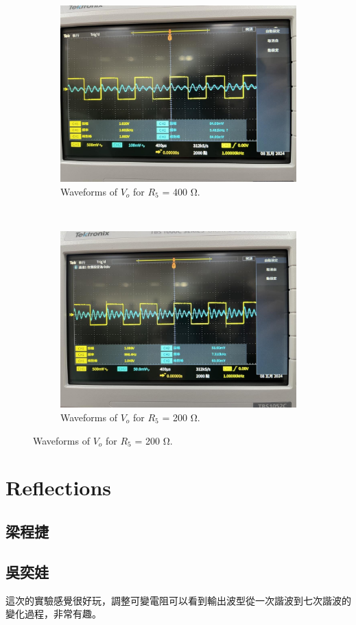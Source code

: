\documentclass{article}
\begin{document}
\begin{CJK*}{UTF8}{bkai}
\begin{figure}[h]
    \begin{center}
        \begin{subfigure}[b]{0.45\textwidth}
            \includegraphics[width=\textwidth]{5th_harmonic.jpg}
            \caption*{Waveforms of $V_o$ for $R_5$ = 400 \unit{\ohm}.}
        \end{subfigure}
        ~
        \begin{subfigure}[b]{0.45\textwidth}
            \includegraphics[width=\textwidth]{7th_harmonic.jpg}
            \caption*{Waveforms of $V_o$ for $R_5$ = 200 \unit{\ohm}.}
        \end{subfigure}
    \end{center}
\end{figure}

\section*{Reflections}
\subsection*{梁程捷}

\subsection*{吳奕娃}
這次的實驗感覺很好玩，調整可變電阻可以看到輸出波型從一次諧波到七次諧波的變化過程，非常有趣。

\end{CJK*}
\end{document}
